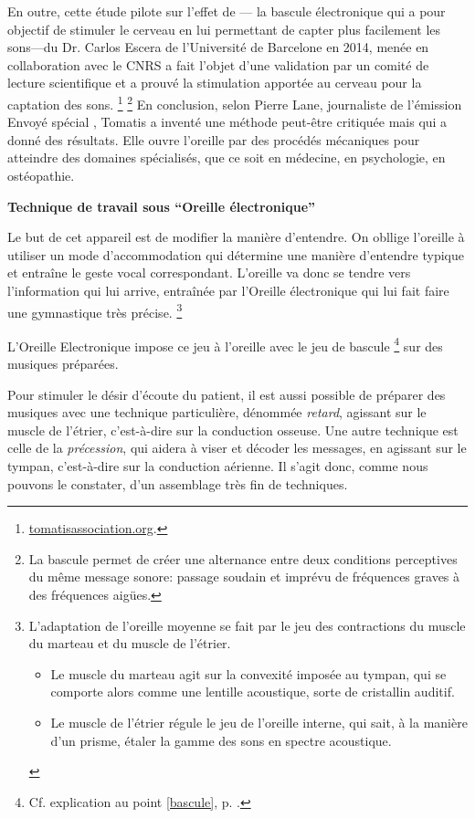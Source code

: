 {En outre, cette étude pilote sur l'effet de 
--- la bascule \label{bascule} électronique qui a pour objectif de stimuler le cerveau en lui 
permettant de capter plus facilement les sons---du Dr. Carlos Escera
de l'Université de Barcelone en 2014, menée en collaboration avec le CNRS  a fait 
l'objet d'une validation
par un comité de lecture scientifique et a prouvé la stimulation
apportée au cerveau pour la captation des sons.
%
\footnote{%
\href{http://tomatisassociation.org/scientific-validation-of-the-tomatis-effect-
eeg-recordings-of-sound-from-brainstem-to-cerebral-cortex-encoding-university-of
-barcelona-2014/}{tomatisassociation.org}.}  \label{bascule}\footnote{La bascule permet 
de créer une alternance entre deux 
conditions perceptives du même message sonore: passage soudain et imprévu de 
fréquences graves à des fréquences aigües.}
En conclusion, selon Pierre Lane, journaliste de l'é\-mi\-s\-sion Envoyé 
spécial%
\autocite{tomatis_methode_1991}, Tomatis
a inventé une méthode peut-être critiquée mais qui a donné des
résultats. Elle ouvre l'oreille par des procédés mécaniques pour atteindre
des domaines spécialisés, que ce soit en médecine, en psychologie,
en ostéopathie.


\textbf{Technique de travail sous ``Oreille électronique''}}
Le but de cet appareil 
est de modifier la manière d'entendre. On obllige l'oreille à utiliser
un mode d'accommodation qui 
détermine une manière d'entendre typique et entraîne le geste
vocal correspondant.
L'oreille va donc se tendre
vers l'information qui lui arrive, entraînée par l'Oreille
électronique qui lui fait faire une
gymnastique très précise. 
\footnote{ L'adaptation de l'oreille moyenne se fait par le jeu des contractions
du muscle du marteau et du muscle de l'étrier.
\begin{itemize}
\item Le muscle du marteau agit sur la convexité imposée au tympan, qui
se comporte alors comme une lentille acoustique, sorte de cristallin
auditif.
\item Le muscle de l'étrier régule le jeu de l'oreille interne, qui sait,
à la manière d'un prisme, étaler la gamme des sons en spectre acoustique.
\end{itemize}}

L'Oreille Electronique impose ce jeu à l'oreille avec le jeu de
bascule \footnote{Cf. explication au point \ref{bascule}, p. \pageref{bascule}.}  sur des musiques préparées.

Pour stimuler le désir d'écoute
du patient, il est aussi possible de préparer des musiques avec une
technique particulière, dénommée \emph{retard}, agissant sur le muscle de
l'étrier, c'est-à-dire sur la conduction osseuse. Une autre technique
est celle de la \emph{précession}, qui aidera à viser et décoder les messages,
en agissant sur le tympan, c'est-à-dire sur la conduction aérienne.
Il s'agit donc, comme nous pouvons le constater, d'un assemblage très
fin de techniques.


